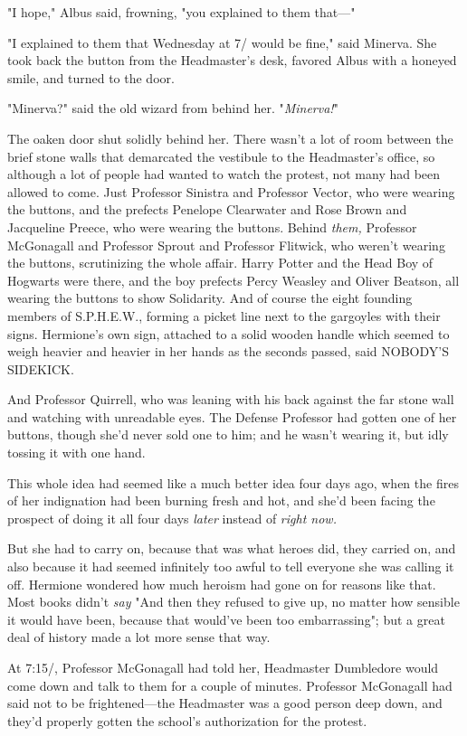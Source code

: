 "I hope," Albus said, frowning, "you explained to them that\mbox{---}"

"I explained to them that Wednesday at 7\PM/ would be fine," said Minerva. She
took back the button from the Headmaster's desk, favored Albus with a honeyed
smile, and turned to the door.

"Minerva?" said the old wizard from behind her. "\emph{Minerva!}"

The oaken door shut solidly behind her.
\sbreak
There wasn't a lot of room between the brief stone walls that demarcated the
vestibule to the Headmaster's office, so although a lot of people had wanted to
watch the protest, not many had been allowed to come. Just Professor Sinistra
and Professor Vector, who were wearing the buttons, and the prefects Penelope
Clearwater and Rose Brown and Jacqueline Preece, who were wearing the buttons.
Behind \emph{them,} Professor McGonagall and Professor Sprout and Professor
Flitwick, who weren't wearing the buttons, scrutinizing the whole affair. Harry
Potter and the Head Boy of Hogwarts were there, and the boy prefects Percy
Weasley and Oliver Beatson, all wearing the buttons to show Solidarity. And of
course the eight founding members of S.P.H.E.W., forming a picket line next to
the gargoyles with their signs. Hermione's own sign, attached to a solid wooden
handle which seemed to weigh heavier and heavier in her hands as the seconds
passed, said NOBODY'S SIDEKICK.

And Professor Quirrell, who was leaning with his back against the far stone
wall and watching with unreadable eyes. The Defense Professor had gotten one of
her buttons, though she'd never sold one to him; and he wasn't wearing it, but
idly tossing it with one hand.

This whole idea had seemed like a much better idea four days ago, when the
fires of her indignation had been burning fresh and hot, and she'd been facing
the prospect of doing it all four days \emph{later} instead of \emph{right now.}

But she had to carry on, because that was what heroes did, they carried on, and
also because it had seemed infinitely too awful to tell everyone she was
calling it off. Hermione wondered how much heroism had gone on for reasons like
that. Most books didn't \emph{say} "And then they refused to give up, no matter
how sensible it would have been, because that would've been too embarrassing";
but a great deal of history made a lot more sense that way.

At 7:15\PM/, Professor McGonagall had told her, Headmaster Dumbledore would come
down and talk to them for a couple of minutes. Professor McGonagall had said
not to be frightened---the Headmaster was a good person deep down, and they'd
properly gotten the school's authorization for the protest.

